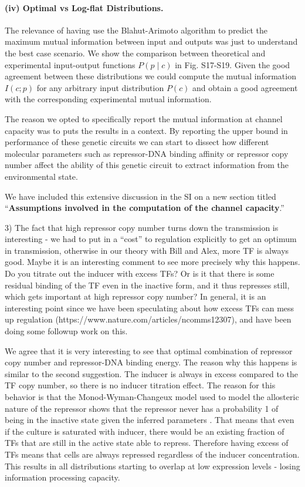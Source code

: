 \paragraph{(iv) Optimal vs Log-flat Distributions.}
The relevance of having use the Blahut-Arimoto algorithm to predict the maximum
mutual information between input and outputs was just to understand the best
case scenario. We show the comparison between theoretical and experimental
input-output functions $P(p \mid c)$ in Fig. S17-S19. Given the good agreement
between these distributions we could compute the mutual information $I(c; p)$
for any arbitrary input distribution $P(c)$ and obtain a good agreement with the
corresponding experimental mutual information.

The reason we opted to specifically report the mutual information at channel
capacity was to puts the results in a context. By reporting the upper bound in
performance of these genetic circuits we can start to dissect how different
molecular parameters such as repressor-DNA binding affinity or repressor copy
number affect the ability of this genetic circuit to extract information from
the environmental state.

We have included this extensive discussion in the SI on a new section titled
``\textbf{Assumptions involved in the computation of the channel capacity}.''

\begin{tcolorbox}
3) The fact that high repressor copy number turns down the transmission is
interesting - we had to put in a “cost” to regulation explicitly to get an
optimum in transmission, otherwise in our theory with Bill and Alex, more TF is
always good. Maybe it is an interesting comment to see more precisely why this
happens. Do you titrate out the inducer with excess TFs? Or is it that there is
some residual binding of the TF even in the inactive form, and it thus represses
still, which gets important at high repressor copy number? In general, it is an
interesting point since we have been speculating about how excess TFs can mess
up regulation (https://www.nature.com/articles/ncomms12307), and have been doing
some followup work on this.
\end{tcolorbox}

We agree that it is very interesting to see that optimal combination of
repressor copy number and repressor-DNA binding energy. The reason why this
happens is similar to the second suggestion. The inducer is always in excess
compared to the TF copy number, so there is no inducer titration effect. The
reason for this behavior is that the Monod-Wyman-Changeux model used to model
the allosteric nature of the repressor shows that the repressor never has a
probability 1 of being in the inactive state given the inferred parameters
\cite{Razo-Mejia2018}. That means that even if the culture is saturated  with
inducer, there would be an existing fraction of TFs that are still in the active
state able to repress. Therefore having excess of TFs means that cells are
always repressed regardless of the inducer concentration. This results in all
distributions starting to overlap at low expression levels - losing information
processing capacity.

